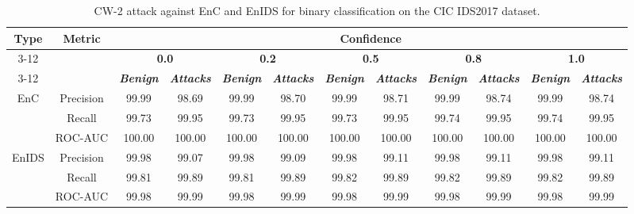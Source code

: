 \documentclass[conference]{IEEEtran}
\begin{document}
	\begin{table}[H]
		\caption{CW-2 attack against EnC and EnIDS for binary classification on the CIC IDS2017 dataset.}
		\small
		\setlength{\tabcolsep}{1pt}
		\centering
		\label{tab:cic_bin_cw}
		
		\begin{tabular}{|c|c|c|c|c|c|c|c|c|c|c|c|}
			\hline
			\multirow{4}{*}{\textbf{Type}} & \multirow{4}{*}{\textbf{Metric}}& \multicolumn{10}{c|}{\textbf{Confidence}} \\
			\cline{3-12}
			&  & \multicolumn{2}{c|}{\textbf{0.0}} & \multicolumn{2}{c|}{\textbf{0.2}} & \multicolumn{2}{c|}{\textbf{0.5}} & \multicolumn{2}{c|}{\textbf{0.8}} & \multicolumn{2}{c|}{\textbf{1.0}}  
			\\
			\cline{3-12}
			&  &  \textbf{\textsl{Benign}} & \textbf{\textsl{Attacks}} & \textbf{\textsl{Benign}} & \textbf{\textsl{Attacks}} & \textbf{\textsl{Benign}} & \textbf{\textsl{Attacks}} & \textbf{\textsl{Benign}} & \textbf{\textsl{Attacks}} & \textbf{\textsl{Benign}} & \textbf{\textsl{Attacks}} \\
			\hline
			\multirow{3}{*}{EnC} & Precision & 99.99 & 98.69 & 99.99 & 98.70 & 99.99 & 98.71 & 99.99 & 98.74 & 99.99 & 98.74
			\\
			
			
			& Recall & 99.73 & 99.95 & 99.73 & 99.95 & 99.73 & 99.95 & 99.74 & 99.95 & 99.74 & 99.95
			\\
			
			
			& ROC-AUC & 100.00 & 100.00 & 100.00 & 100.00 & 100.00 & 100.00 & 100.00 & 100.00 & 100.00 & 100.00
			\\
			\hline
			\multirow{3}{*}{EnIDS} & Precision & 99.98 & \cellcolor{yellow!50}99.07 & 99.98 & \cellcolor{yellow!50}99.09 & 99.98 & \cellcolor{yellow!50}99.11 & 99.98 & \cellcolor{yellow!50}99.11 & 99.98 & \cellcolor{yellow!50}99.11
			\\
			
			
			& Recall & \cellcolor{yellow!50}99.81 & 99.89 & \cellcolor{yellow!50}99.81 & 99.89 & \cellcolor{yellow!50}99.82 & 99.89 & \cellcolor{yellow!50}99.82 & 99.89 & \cellcolor{yellow!50}99.82 & 99.89
			\\
			
			
			& ROC-AUC & 99.98 & 99.99 & 99.98 & 99.99 & 99.98 & 99.99 & 99.98 & 99.99 & 99.98 & 99.99
			\\
			\hline
		\end{tabular}
		
	\end{table}
	
\end{document}

